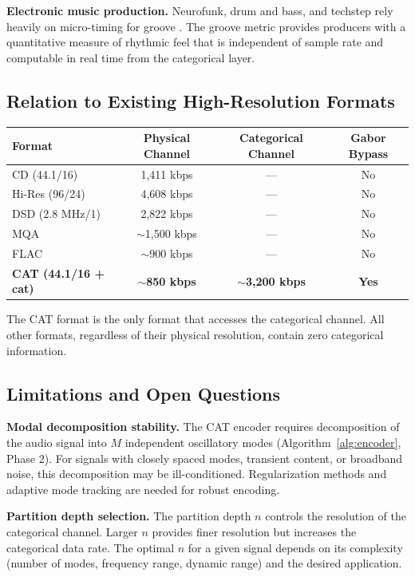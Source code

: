 \documentclass[twocolumn,10pt]{article}
\theoremstyle{remark}
\begin{document}
\textbf{Electronic music production.}
Neurofunk, drum and bass, and techstep rely heavily on micro-timing for groove \cite{iyer2002, danielsen2010}. The groove metric provides producers with a quantitative measure of rhythmic feel that is independent of sample rate and computable in real time from the categorical layer.

\subsection{Relation to Existing High-Resolution Formats}

\begin{center}
\begin{tabular}{lccc}
\toprule
Format & Physical Channel & Categorical Channel & Gabor Bypass \\
\midrule
CD (44.1/16) & 1,411 kbps & --- & No \\
Hi-Res (96/24) & 4,608 kbps & --- & No \\
DSD (2.8 MHz/1) & 2,822 kbps & --- & No \\
MQA & $\sim$1,500 kbps & --- & No \\
FLAC & $\sim$900 kbps & --- & No \\
\textbf{CAT (44.1/16 + cat)} & \textbf{$\sim$850 kbps} & \textbf{$\sim$3,200 kbps} & \textbf{Yes} \\
\bottomrule
\end{tabular}
\end{center}

The CAT format is the only format that accesses the categorical channel. All other formats, regardless of their physical resolution, contain zero categorical information.

\subsection{Limitations and Open Questions}

\textbf{Modal decomposition stability.}
The CAT encoder requires decomposition of the audio signal into $M$ independent oscillatory modes (Algorithm~\ref{alg:encoder}, Phase 2). For signals with closely spaced modes, transient content, or broadband noise, this decomposition may be ill-conditioned. Regularization methods and adaptive mode tracking are needed for robust encoding.

\textbf{Partition depth selection.}
The partition depth $n$ controls the resolution of the categorical channel. Larger $n$ provides finer resolution but increases the categorical data rate. The optimal $n$ for a given signal depends on its complexity (number of modes, frequency range, dynamic range) and the desired application.
\end{document}
